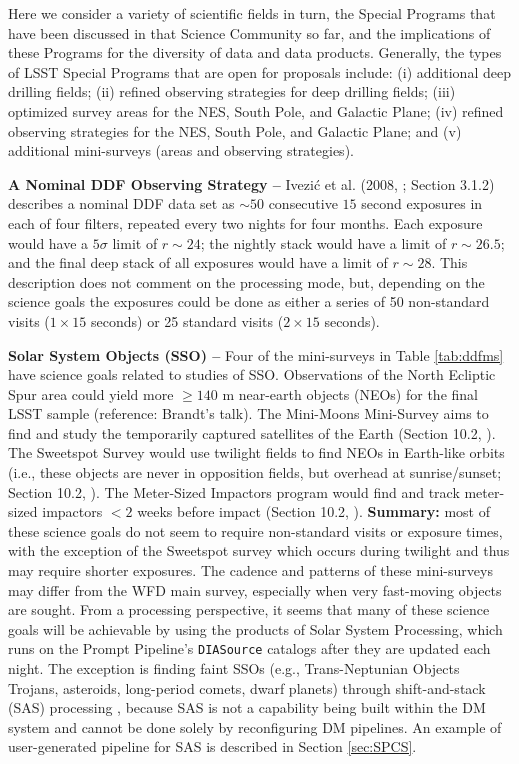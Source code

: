 \documentclass[DM,lsstdoc,toc]{lsstdoc}
\begin{document}
Here we consider a variety of scientific fields in turn, the Special Programs that have been discussed in that Science Community so far, and the implications of these Programs for the diversity of data and data products. Generally, the types of LSST Special Programs that are open for proposals include: (i) additional deep drilling fields; (ii) refined observing strategies for deep drilling fields; (iii) optimized survey areas for the NES, South Pole, and Galactic Plane; (iv) refined observing strategies for the NES, South Pole, and Galactic Plane; and (v) additional mini-surveys (areas and observing strategies).

\medskip
\noindent \textbf{A Nominal DDF Observing Strategy -- } Ivezi\'{c} et al. (2008, \citep{2008arXiv0805.2366I}; Section 3.1.2) describes a nominal DDF data set as $\sim50$ consecutive $15$ second exposures in each of four filters, repeated every two nights for four months. Each exposure would have a $5\sigma$ limit of $r\sim24$; the nightly stack would have a limit of $r\sim26.5$; and the final deep stack of all exposures would have a limit of $r\sim28$. This description does not comment on the processing mode, but, depending on the science goals the exposures could be done as either a series of 50 non-standard visits ($1\times15$ seconds) or 25 standard visits ($2\times15$ seconds). 

\medskip
\noindent \textbf{Solar System Objects (SSO) -- } Four of the mini-surveys in Table \ref{tab:ddfms} have science goals related to studies of SSO. Observations of the North Ecliptic Spur area could yield more $\geq140$ m near-earth objects (NEOs) for the final LSST sample (reference: Brandt's talk). The Mini-Moons Mini-Survey aims to find and study the temporarily captured satellites of the Earth (Section 10.2, \citep{2017arXiv170804058L}). The Sweetspot Survey would use twilight fields to find NEOs in Earth-like orbits (i.e., these objects are never in opposition fields, but overhead at sunrise/sunset; Section 10.2, \citep{2017arXiv170804058L}). The Meter-Sized Impactors program would find and track meter-sized impactors $<2$ weeks before impact (Section 10.2, \citep{2017arXiv170804058L}). {\bf Summary:} most of these science goals do not seem to require non-standard visits or exposure times, with the exception of the Sweetspot survey which occurs during twilight and thus may require shorter exposures. The cadence and patterns of these mini-surveys may differ from the WFD main survey, especially when very fast-moving objects are sought. From a processing perspective, it seems that many of these science goals will be achievable by using the products of Solar System Processing, which runs on the Prompt Pipeline's \texttt{DIASource} catalogs after they are updated each night. The exception is finding faint SSOs (e.g., Trans-Neptunian Objects Trojans, asteroids, long-period comets, dwarf planets) through shift-and-stack (SAS) processing , because SAS is not a capability being built within the DM system and cannot be done solely by reconfiguring DM pipelines. An example of user-generated pipeline for SAS is described in Section \ref{sec:SPCS}.
\end{document}
